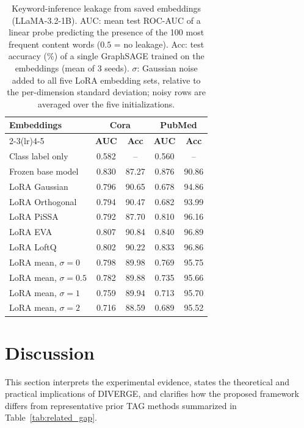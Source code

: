 \documentclass[a4paper,fleqn]{cas-sc}
\begin{document}
\begin{table}[htbp]
\centering\color{red}
\caption{Keyword-inference leakage from saved embeddings (LLaMA-3.2-1B). AUC: mean test ROC-AUC of a linear probe predicting the presence of the 100 most frequent content words ($0.5$ = no leakage). Acc: test accuracy (\%) of a single GraphSAGE trained on the embeddings (mean of 3 seeds). $\sigma$: Gaussian noise added to all five LoRA embedding sets, relative to the per-dimension standard deviation; noisy rows are averaged over the five initializations.}
\label{tab:privacy_probe}
\small
\begin{tabular*}{\columnwidth}{@{\extracolsep{\fill}} lcccc @{}}
\toprule
\multirow{2}{*}{\textbf{Embeddings}} & \multicolumn{2}{c}{\textbf{Cora}} & \multicolumn{2}{c}{\textbf{PubMed}} \\
\cmidrule(lr){2-3}\cmidrule(lr){4-5}
 & \textbf{AUC} & \textbf{Acc} & \textbf{AUC} & \textbf{Acc} \\
\midrule
Class label only    & 0.582 & --    & 0.560 & --    \\
Frozen base model   & 0.830 & 87.27 & 0.876 & 90.86 \\
\midrule
LoRA Gaussian       & 0.796 & 90.65 & 0.678 & 94.86 \\
LoRA Orthogonal     & 0.794 & 90.47 & 0.682 & 93.99 \\
LoRA PiSSA          & 0.792 & 87.70 & 0.810 & 96.16 \\
LoRA EVA            & 0.807 & 90.84 & 0.840 & 96.89 \\
LoRA LoftQ          & 0.802 & 90.22 & 0.833 & 96.86 \\
\midrule
LoRA mean, $\sigma=0$   & 0.798 & 89.98 & 0.769 & 95.75 \\
LoRA mean, $\sigma=0.5$ & 0.782 & 89.88 & 0.735 & 95.66 \\
LoRA mean, $\sigma=1$   & 0.759 & 89.94 & 0.713 & 95.70 \\
LoRA mean, $\sigma=2$   & 0.716 & 88.59 & 0.689 & 95.52 \\
\bottomrule
\end{tabular*}
\end{table}

\section{Discussion}\label{sec:Discussion}

This section interprets the experimental evidence, states the theoretical and practical implications of DIVERGE, and clarifies how the proposed framework differs from representative prior TAG methods summarized in Table~\ref{tab:related_gap}.
\end{document}
